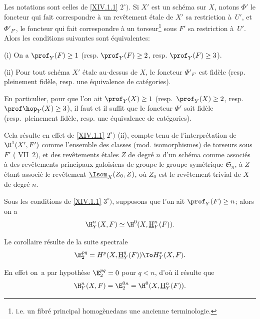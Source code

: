 \begin{corollaire} \label{XIV.1.4} Les notations sont celles de \ref{XIV.1.1} $2^\circ)$. Si $X'$ est un sch\'ema sur $X$, notons $\Phi'$ le foncteur qui fait correspondre \`a un rev\^etement \'etale de $X'$ sa restriction \`a~$U'$, et $\Phi'_{F'}$, le foncteur qui fait correspondre \`a un torseur\footnote{i.e. un \og fibr\'e principal homog\`ene\fg dans une ancienne terminologie.} sous $F'$ sa restriction \`a~$U'$. Alors les conditions suivantes sont \'equivalentes:

\textup{(i)} On a $\prof_Y(F)\geq 1$ (resp. $\prof_Y(F)\geq 2$, resp. $\prof_Y(F)\geq 3$).

\textup{(ii)} Pour tout sch\'ema $X'$ \'etale au-dessus de $X$, le foncteur $\Phi'_{F'}$ est fid\`ele (resp. pleinement fid\`ele, resp. une \'equivalence de cat\'egories).

En particulier, pour que l'on ait $\prof_Y({X})\geq 1$ (resp.\ $\prof_Y({X})\geq 2$, resp.\ $\prof \hop_Y(X)\geq 3$), il faut et il suffit que le foncteur $\Phi'$ soit fid\`ele (resp.\ pleinement fid\`ele, resp. une \'equivalence de cat\'egories).
\end{corollaire}

Cela r\'esulte en effet de \ref{XIV.1.1} $2^\circ)$ \textup{(ii)}, compte tenu de l'interpr\'etation de $\H^1(X', F')$ comme l'ensemble des classes (mod. isomorphismes) de torseurs sous $F'$ ( VII~2), et des rev\^etements \'etales $Z$ de degr\'e $n$ d'un sch\'ema comme associ\'es \`a des rev\^etements principaux galoisiens de groupe le groupe sym\'etrique $\mathfrak{S}_n$, \`a $Z$ \'etant associ\'e le rev\^etement $\underline{\Isom}_X(Z_0, Z)$, o\`u $Z_0$ est le rev\^etement trivial de $X$ de degr\'e $n$.

\begin{corollaire} \label{XIV.1.5} Sous les conditions de \ref{XIV.1.1} $3^\circ)$, supposons que l'on ait $\prof_Y(F)\geq n$; alors on a
$$
\H_Y^n(X, F)\simeq \H^0(X, {\mathop{\underline{\mathrm{H}}}\nolimits}_Y^n(F)).
$$
\end{corollaire}

Le corollaire r\'esulte de la suite spectrale
$$
\E_2^{pq}=H^p(X, {\mathop{\underline{\mathrm{H}}}\nolimits}_Y^q(F))\To H_Y^*(X, F).
$$

En effet on~a par hypoth\`ese $\E_2^{pq}=0$ pour $q<n$, d'o\`u il r\'esulte que
$$
\H_Y^n(X, F)=\E_2^{0n}=\H^0(X, {\mathop{\underline{\mathrm{H}}}\nolimits}_Y^n(F)).
$$


